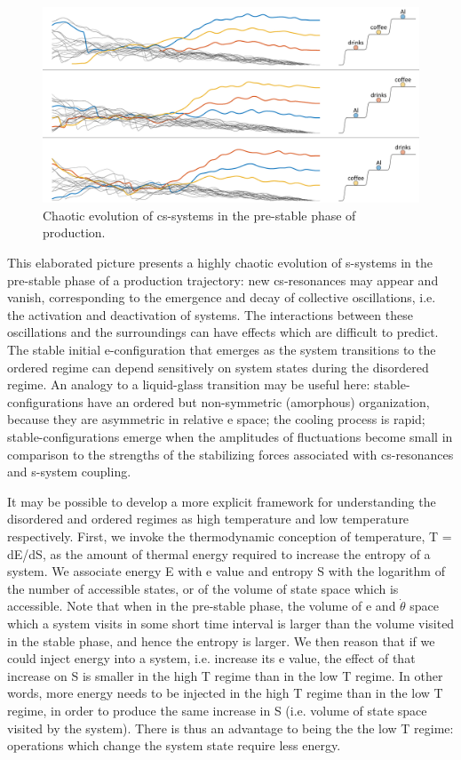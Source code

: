    
\begin{figure}
\includegraphics[width=\textwidth]{figures/Tilsen-img77.png}
\caption{Chaotic evolution of cs-systems in the pre-stable phase of production.}
\label{fig:4:27}
\end{figure}
 

  This elaborated picture presents a highly chaotic evolution of s-systems in the pre-stable phase of a production trajectory: new cs-resonances may appear and vanish, corresponding to the emergence and decay of collective oscillations, i.e. the activation and deactivation of systems. The interactions between these oscillations and the surroundings can have effects which are difficult to predict. The stable initial e-configuration that emerges as the system transitions to the ordered regime can depend sensitively on system states during the disordered regime. An analogy to a liquid-glass transition may be useful here: stable-configurations have an ordered but non-symmetric  (amorphous) organization, because they are asymmetric in relative e space; the cooling process is rapid; stable-configurations emerge when the amplitudes of fluctuations become small in comparison to the strengths of the stabilizing forces associated with cs-resonances and s-system coupling.

  It may be possible to develop a more explicit framework for understanding the disordered and ordered regimes as high temperature and low temperature respectively. First, we invoke the thermodynamic conception of temperature, T = dE/dS, as the amount of thermal energy required to increase the entropy of a system. We associate energy E with e value and entropy S with the logarithm of the number of accessible states, or of the volume of state space which is accessible. Note that when in the pre-stable phase, the volume of e and $\dot{\theta}$ space which a system visits in some short time interval is larger than the volume visited in the stable phase, and hence the entropy is larger. We then reason that if we could inject energy into a system, i.e. increase its e value, the effect of that increase on S is smaller in the high T regime than in the low T regime. In other words, more energy needs to be injected in the high T regime than in the low T regime, in order to produce the same increase in S (i.e. volume of state space visited by the system). There is thus an advantage to being the the low T regime: operations which change the system state require less energy.

